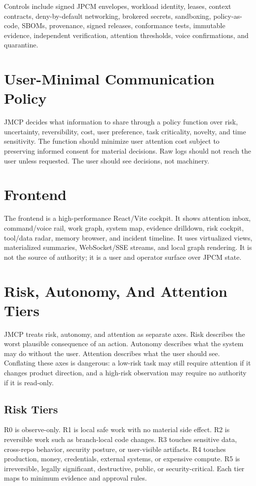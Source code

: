 \documentclass[10pt,journal,onecolumn]{IEEEtran}
\begin{document}
Controls include signed JPCM envelopes, workload identity, leases, context contracts, deny-by-default networking, brokered secrets, sandboxing, policy-as-code, SBOMs, provenance, signed releases, conformance tests, immutable evidence, independent verification, attention thresholds, voice confirmations, and quarantine.

\section{User-Minimal Communication Policy}
JMCP decides what information to share through a policy function over risk, uncertainty, reversibility, cost, user preference, task criticality, novelty, and time sensitivity. The function should minimize user attention cost subject to preserving informed consent for material decisions. Raw logs should not reach the user unless requested. The user should see decisions, not machinery.

\section{Frontend}
The frontend is a high-performance React/Vite cockpit. It shows attention inbox, command/voice rail, work graph, system map, evidence drilldown, risk cockpit, tool/data radar, memory browser, and incident timeline. It uses virtualized views, materialized summaries, WebSocket/SSE streams, and local graph rendering. It is not the source of authority; it is a user and operator surface over JPCM state.



\section{Risk, Autonomy, And Attention Tiers}
JMCP treats risk, autonomy, and attention as separate axes. Risk describes the worst plausible consequence of an action. Autonomy describes what the system may do without the user. Attention describes what the user should see. Conflating these axes is dangerous: a low-risk task may still require attention if it changes product direction, and a high-risk observation may require no authority if it is read-only.

\subsection{Risk Tiers}
R0 is observe-only. R1 is local safe work with no material side effect. R2 is reversible work such as branch-local code changes. R3 touches sensitive data, cross-repo behavior, security posture, or user-visible artifacts. R4 touches production, money, credentials, external systems, or expensive compute. R5 is irreversible, legally significant, destructive, public, or security-critical. Each tier maps to minimum evidence and approval rules.
\end{document}
